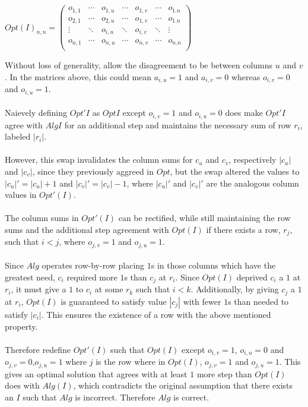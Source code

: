 \documentclass[12pt]{article}
\begin{document}
\begin{center}
$
Opt(I)_{n,n} = 
    \begin{pmatrix}
    o_{1,1} & \cdots & o_{1,u} & \cdots & o_{1,v} & \cdots & o_{1.n} \\
    o_{2,1} & \cdots & o_{2,u} & \cdots & o_{1,v} & \cdots & o_{1.n} \\
    \vdots  & \ddots & o_{i,u} & \ddots & o_{i,v} & \ddots & \vdots \\ 
    o_{n,1} & \cdots & o_{n,u} & \cdots & o_{n,v} & \cdots & o_{n.n} \\
    \end{pmatrix}
$ 
\end{center}
Without loss of generality, allow the disagreement to be between columns
$u$ and $v$.  In the matrices above, this could mean $a_{i,u}=1$ and
$a_{i,v}=0$ whereas $o_{i,v}=0$ and $o_{i,u}=1$.\\\\
Naievely defining $Opt'{I}$ as $Opt{I}$ except $o_{i,v}=1$ and $o_{i,u}=0$
does make $Opt'{I}$ agree with $Alg{I}$ for an additional step and maintains
the necessary sum of row $r_i$, labeled $|r_i|$.\\\\
However, this swap invalidates the
column sums for $c_u$ and $c_v$, respectively $|c_u|$ and $|c_v|$, since they
previously aggreed in $Opt$, but the swap altered the values to $|c_u|' = |c_u|+1$
and $|c_v|'=|c_v|-1$, where $|c_u|'$ and $|c_v|'$ are the analogous column values
in $Opt'(I)$.\\\\
The column sums in $Opt'(I)$ can be rectified, while still maintaining the row sums
and the additional step agreement with $Opt(I)$ if there exists a row, $r_j$, such
that $i < j$, where $o_{j,v} = 1$ and $o_{j,u}=1$.\\\\
Since $Alg$ operates row-by-row placing $1$s in those columns which have the greatest
need, $c_i$ required more $1$s than $c_j$ at $r_i$.  Since $Opt(I)$ deprived $c_i$ a 
$1$ at $r_i$, it must give a $1$ to $c_i$ at some $r_k$ such that $i < k$.  Additionally,
by giving $c_j$ a $1$ at $r_i$, $Opt(I)$ is guaranteed to satisfy value $|c_j|$ with fewer
$1$s than needed to satisfy $|c_i|$.  This ensures the existence of a row with the
above mentioned property.\\\\
Therefore redefine $Opt'(I)$ such that $Opt(I)$ except $o_{i,v}=1$, $o_{i,u}=0$ and
$o_{j,v}=0$,$o_{j,u}=1$
where $j$ is the row where in $Opt(I)$, $o_{j,v}=1$ and $o_{j,u}=1$.  This gives an optimal
solution that agrees with at least $1$ more step than $Opt(I)$ does with $Alg(I)$, which
contradicts the original assumption that there exists an $I$ such that $Alg$ is incorrect.
Therefore $Alg$ is correct.
\end{document}
